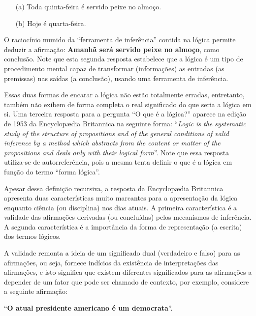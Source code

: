 \begin{itemize}
	\item[(a)] Toda quinta-feira é servido peixe no almoço.
	\item[(b)] Hoje é quarta-feira.
\end{itemize}

O raciocínio munido da ``ferramenta de inferência'' contida na lógica permite deduzir a afirmação: \textbf{Amanhã será servido peixe no almoço}, como conclusão. Note que esta segunda resposta estabelece que a lógica é um tipo de procedimento mental capaz de transformar (informações) as entradas (as premissas) nas saídas (a conclusão), usando uma ferramenta de inferência.

Essas duas formas de encarar a lógica não estão totalmente erradas, entretanto, também não exibem de forma completa o real significado do que seria a lógica em si. Uma terceira resposta para a pergunta ``O que é a lógica?'' aparece na edição de 1953 da Encyclopædia Britannica na seguinte forma: ``\textit{Logic is the systematic study of the structure of propositions and of the general conditions of valid inference by a method which abstracts from the content or matter of the propositions and deals only with their logical form}''. Note que essa resposta utiliza-se de autorreferência, pois a mesma tenta definir o que é a lógica em função do termo ``forma lógica''.

Apesar dessa definição recursiva, a resposta da Encyclopædia Britannica apresenta duas características muito marcantes para a apresentação da lógica enquanto ciência (ou disciplina) nos dias atuais. A primeira característica é a validade das afirmações derivadas (ou concluídas) pelos mecanismos de inferência. A segunda característica é a importância da forma de representação (a escrita) dos termos lógicos.

A validade remonta a ideia de um significado dual (verdadeiro e falso) para as afirmações, ou seja, fornece indícios da existência de interpretações das afirmações, e isto significa que existem diferentes significados para as afirmações a depender de um fator que pode ser chamado de contexto, por exemplo, considere a seguinte afirmação:

\begin{center}
	``\textbf{O atual presidente americano é um democrata}''.
\end{center}

